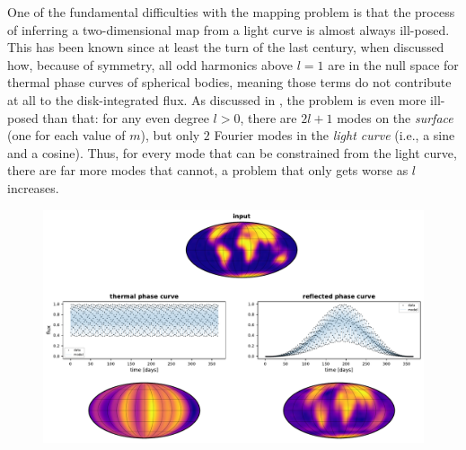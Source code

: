 \documentclass[modern]{aastex62}
\begin{document}
One of the fundamental difficulties with the mapping problem is that
the process of inferring a two-dimensional map from a light curve
is almost always ill-posed. This has been known since at least
the turn of the last century, when \citet{Russell1906} discussed
how, because of symmetry,
all odd harmonics above $l = 1$ are in the null space for thermal
phase curves of spherical bodies, meaning those terms do not contribute
at all to the disk-integrated flux. As discussed in \citet{Luger2019},
the problem is even more ill-posed than that: for any even
degree $l > 0$, there are $2l + 1$ modes on the \emph{surface}
(one for each value of $m$), but only $2$ Fourier modes in the
\emph{light curve} (i.e., a sine and a cosine). Thus, for every
mode that can be constrained from the light curve, there are far
more modes that cannot, a problem that only gets worse as $l$
increases.

\begin{figure}[t!]
    \begin{centering}
        \includegraphics[width=\linewidth]{figures/inference.pdf}
    \end{centering}
\end{figure}
\end{document}
